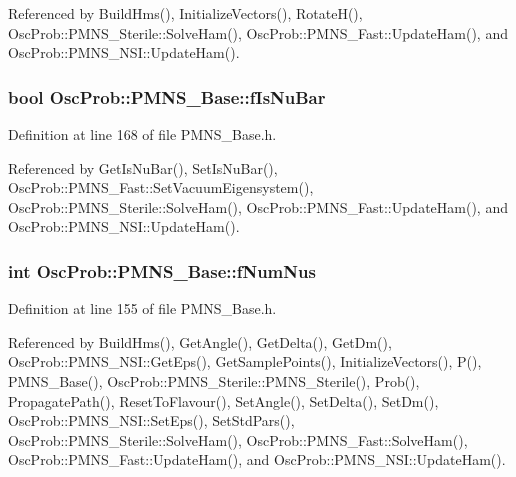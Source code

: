 Referenced by Build\+Hms(), Initialize\+Vectors(), Rotate\+H(), Osc\+Prob\+::\+P\+M\+N\+S\+\_\+\+Sterile\+::\+Solve\+Ham(), Osc\+Prob\+::\+P\+M\+N\+S\+\_\+\+Fast\+::\+Update\+Ham(), and Osc\+Prob\+::\+P\+M\+N\+S\+\_\+\+N\+S\+I\+::\+Update\+Ham().

\subsubsection[{\texorpdfstring{f\+Is\+Nu\+Bar}{fIsNuBar}}]{\setlength{\rightskip}{0pt plus 5cm}bool Osc\+Prob\+::\+P\+M\+N\+S\+\_\+\+Base\+::f\+Is\+Nu\+Bar\hspace{0.3cm}{\ttfamily [protected]}}\hypertarget{classOscProb_1_1PMNS__Base_a0ebaeaefab36a3ff381c6293faedfdd6}{}\label{classOscProb_1_1PMNS__Base_a0ebaeaefab36a3ff381c6293faedfdd6}


Definition at line 168 of file P\+M\+N\+S\+\_\+\+Base.\+h.



Referenced by Get\+Is\+Nu\+Bar(), Set\+Is\+Nu\+Bar(), Osc\+Prob\+::\+P\+M\+N\+S\+\_\+\+Fast\+::\+Set\+Vacuum\+Eigensystem(), Osc\+Prob\+::\+P\+M\+N\+S\+\_\+\+Sterile\+::\+Solve\+Ham(), Osc\+Prob\+::\+P\+M\+N\+S\+\_\+\+Fast\+::\+Update\+Ham(), and Osc\+Prob\+::\+P\+M\+N\+S\+\_\+\+N\+S\+I\+::\+Update\+Ham().

\subsubsection[{\texorpdfstring{f\+Num\+Nus}{fNumNus}}]{\setlength{\rightskip}{0pt plus 5cm}int Osc\+Prob\+::\+P\+M\+N\+S\+\_\+\+Base\+::f\+Num\+Nus\hspace{0.3cm}{\ttfamily [protected]}}\hypertarget{classOscProb_1_1PMNS__Base_a24bb74bed63569dfe88b18fa6a08060e}{}\label{classOscProb_1_1PMNS__Base_a24bb74bed63569dfe88b18fa6a08060e}


Definition at line 155 of file P\+M\+N\+S\+\_\+\+Base.\+h.



Referenced by Build\+Hms(), Get\+Angle(), Get\+Delta(), Get\+Dm(), Osc\+Prob\+::\+P\+M\+N\+S\+\_\+\+N\+S\+I\+::\+Get\+Eps(), Get\+Sample\+Points(), Initialize\+Vectors(), P(), P\+M\+N\+S\+\_\+\+Base(), Osc\+Prob\+::\+P\+M\+N\+S\+\_\+\+Sterile\+::\+P\+M\+N\+S\+\_\+\+Sterile(), Prob(), Propagate\+Path(), Reset\+To\+Flavour(), Set\+Angle(), Set\+Delta(), Set\+Dm(), Osc\+Prob\+::\+P\+M\+N\+S\+\_\+\+N\+S\+I\+::\+Set\+Eps(), Set\+Std\+Pars(), Osc\+Prob\+::\+P\+M\+N\+S\+\_\+\+Sterile\+::\+Solve\+Ham(), Osc\+Prob\+::\+P\+M\+N\+S\+\_\+\+Fast\+::\+Solve\+Ham(), Osc\+Prob\+::\+P\+M\+N\+S\+\_\+\+Fast\+::\+Update\+Ham(), and Osc\+Prob\+::\+P\+M\+N\+S\+\_\+\+N\+S\+I\+::\+Update\+Ham().

